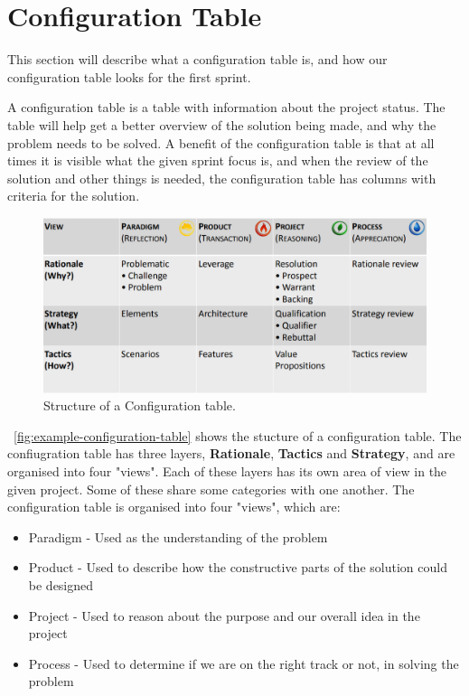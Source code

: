 \section{Configuration Table}\label{sec:first-configuration-table}
This section will describe what a configuration table is, and how our configuration table looks for the first sprint.

A configuration table is a table with information about the project status. 
The table will help get a better overview of the solution being made, and why the problem needs to be solved.
A benefit of the configuration table is that at all times it is visible what the given sprint focus is, and when the review of the solution and other things is needed, the configuration table has columns with criteria for the solution.

\begin{figure}[h]
    \centering
    \includegraphics[width=\linewidth]{images/configurationTableExample.png}
    \caption{Structure of a Configuration table.}
    \label{fig:example-configuration-table}
\end{figure}

~\autoref{fig:example-configuration-table} shows the stucture of a configuration table.
The confiugration table has three layers, \textbf{Rationale}, \textbf{Tactics} and \textbf{Strategy}, and are organised into four "views".
Each of these layers has its own area of view in the given project.
Some of these share some categories with one another.
The configuration table is organised into four "views", which are:

\begin{itemize}
    \item Paradigm - Used as the understanding of the problem
    \item Product - Used to describe how the constructive parts of the solution could be designed
    \item Project - Used to reason about the purpose and our overall idea in the project
    \item Process - Used to determine if we are on the right track or not, in solving the problem
\end{itemize}

